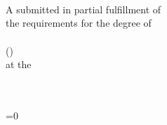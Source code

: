 \documentclass[12pt,letterpaper,oneside]{Thesis}
\begin{document}
\begin{titlepage}
\begin{center}

\HRule \\[0.4cm]
{\huge \bfseries \ttitle}\\[0.4cm]
\HRule \\[1.5cm]

\begin{center} \large
\authornames 
\end{center}
 
\large A \manuscripttype submitted in partial fulfillment of \\ the requirements for the degree of\\[1cm]
\degreename \\
(\subjectname) \\[1cm]
 at the\\
\textsc{\univname}\\
{\large \graduationmonth \ \graduationyear}\\[4cm]
 
\vfill
\end{center}

\end{titlepage}

\else\ifnum{}=0
\end{document}
